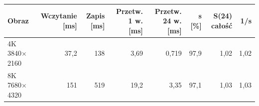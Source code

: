 \begin{tabular}{lrrrrrrr}
\toprule
Obraz & Wczytanie [ms] & Zapis [ms] & Przetw. 1 w. [ms] & Przetw. 24 w. [ms] & s [\%] & S(24) całość & 1/s \\
\midrule
4K 3840$\times$2160 & 37,2 & 138 & 3,69 & 0,719 & 97,9 & 1,02 & 1,02 \\
8K 7680$\times$4320 & 151 & 519 & 19,2 & 3,35 & 97,1 & 1,03 & 1,03 \\
\bottomrule
\end{tabular}
